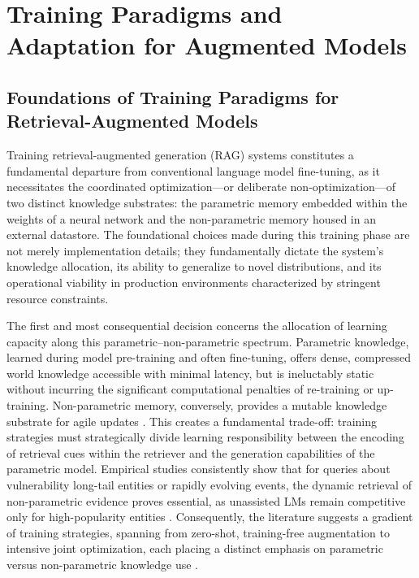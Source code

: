 \documentclass[11pt,a4paper]{article}
\begin{document}
\section{Training Paradigms and Adaptation for Augmented Models}



\subsection{Foundations of Training Paradigms for Retrieval-Augmented Models}


Training retrieval-augmented generation (RAG) systems constitutes a fundamental departure from conventional language model fine-tuning, as it necessitates the coordinated optimization---or deliberate non-optimization---of two distinct knowledge substrates: the parametric memory embedded within the weights of a neural network and the non-parametric memory housed in an external datastore. The foundational choices made during this training phase are not merely implementation details; they fundamentally dictate the system's knowledge allocation, its ability to generalize to novel distributions, and its operational viability in production environments characterized by stringent resource constraints.

The first and most consequential decision concerns the allocation of learning capacity along this parametric--non-parametric spectrum. Parametric knowledge, learned during model pre-training and often fine-tuning, offers dense, compressed world knowledge accessible with minimal latency, but is ineluctably static without incurring the significant computational penalties of re-training or up-training. Non-parametric memory, conversely, provides a mutable knowledge substrate for agile updates \cite{arxiv:2402.01364v2}. This creates a fundamental trade-off: training strategies must strategically divide learning responsibility between the encoding of retrieval cues within the retriever and the generation capabilities of the parametric model. Empirical studies consistently show that for queries about vulnerability long-tail entities or rapidly evolving events, the dynamic retrieval of non-parametric evidence proves essential, as unassisted LMs remain competitive only for high-popularity entities \cite{arxiv:2212.10511v4}. Consequently, the literature suggests a gradient of training strategies, spanning from zero-shot, training-free augmentation to intensive joint optimization, each placing a distinct emphasis on parametric versus non-parametric knowledge use \cite{arxiv:2407.13193v2}.
\end{document}

